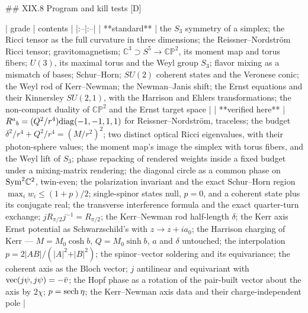 ## XIX.8 Program and kill tests [D]

| grade | contents |
|:--|:--|
| **standard** | the $S_3$ symmetry of a simplex; the Ricci tensor as the full curvature in three dimensions; the Reissner–Nordström Ricci tensor; gravitomagnetism; $\mathbb C^3\supset S^5\to\mathbb{CP}^2$, its moment map and torus fibers; $U(3)$, its maximal torus and the Weyl group $S_3$; flavor mixing as a mismatch of bases; Schur–Horn; $SU(2)$ coherent states and the Veronese conic; the Weyl rod of Kerr–Newman; the Newman–Janis shift; the Ernst equations and their Kinnersley $SU(2,1)$, with the Harrison and Ehlers transformations; the non-compact duality of $\mathbb{CP}^2$ and the Ernst target space |
| **verified here** | $R^a{}_b = (Q^2/r^4){\rm diag}(-1,-1,1,1)$ for Reissner–Nordström, traceless; the budget $\delta^2/r^4+Q^2/r^4 = (M/r^2)^2$; two distinct optical Ricci eigenvalues, with their photon-sphere values; the moment map's image the simplex with torus fibers, and the Weyl lift of $S_3$; phase repacking of rendered weights inside a fixed budget under a mixing-matrix rendering; the diagonal circle as a common phase on ${\rm Sym}^2\mathbb C^2$, twin-even; the polarization invariant and the exact Schur–Horn region $\max_iw_i\leq(1+p)/2$; single-spinor states null, $p = 0$, and a coherent state plus its conjugate real; the transverse interference formula and the exact quarter-turn exchange; $jR_{\pi/2}j^{-1} = R_{\pi/2}$; the Kerr–Newman rod half-length $\delta$; the Kerr axis Ernst potential as Schwarzschild's with $z\to z+ia_0$; the Harrison charging of Kerr — $M = M_0\cosh b$, $Q = M_0\sinh b$, $a$ and $\delta$ untouched; the interpolation $p = 2\vert AB\vert/(\vert A\vert^2+\vert B\vert^2)$; the spinor–vector soldering and its equivariance; the coherent axis as the Bloch vector; $j$ antilinear and equivariant with ${\rm vec}(j\psi,j\psi) = -\bar v$; the Hopf phase as a rotation of the pair-built vector about the axis by $2\chi$; $p = {\rm sech}\,\eta$; the Kerr–Newman axis data and their charge-independent pole |
